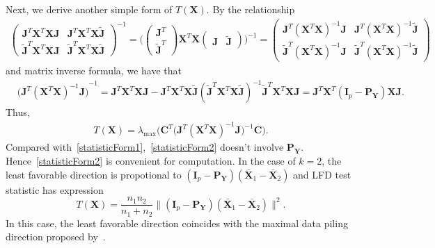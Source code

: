 \documentclass[12pt]{article} %
\newcommand{\bA}{\mathbf{A}}
\newcommand{\bX}{\mathbf{X}}
\newcommand{\bP}{\mathbf{P}}
\newcommand{\bY}{\mathbf{Y}}
\newcommand{\bJ}{\mathbf{J}}
\newcommand{\bC}{\mathbf{C}}
\newcommand{\bI}{\mathbf{I}}
\theoremstyle{definition}
\begin{document}
Next, we derive another simple form of $T(\bX)$.
By the relationship
\begin{equation*}
    \begin{aligned}
        \begin{pmatrix}
            \bJ^T \bX^T \bX\bJ & \bJ^T \bX^T \bX\tilde{\bJ}\\
            \tilde{\bJ}^T \bX^T \bX \bJ & \tilde{\bJ}^T \bX^T \bX \tilde{\bJ}
        \end{pmatrix}^{-1}
        =
        \Big(
        \begin{pmatrix}
            \bJ^T\\
            \tilde{\bJ}^T
        \end{pmatrix}
        \bX^T \bX
        \begin{pmatrix}
            \bJ &\tilde{\bJ}
        \end{pmatrix}
        \Big)^{-1}
        =
        \begin{pmatrix}
            \bJ^T {(\bX^T \bX)}^{-1}\bJ & \bJ^T {(\bX^T \bX)}^{-1}\tilde{\bJ}\\
            \tilde{\bJ}^T {(\bX^T \bX)}^{-1}\bJ & \tilde{\bJ}^T {(\bX^T \bX)}^{-1} \tilde{\bJ}
        \end{pmatrix}
    \end{aligned}
\end{equation*}
and matrix inverse formula, we have that
\begin{equation*}
    \begin{aligned}
        &{\big( \bJ^T {(\bX^T \bX)}^{-1}\bJ \big)}^{-1}
        =\bJ^T \bX^T \bX \bJ - \bJ^T \bX^T \bX\tilde{\bJ}{(\tilde{\bJ}^T \bX^T \bX \tilde{\bJ})}^{-1}
            \tilde{\bJ}^T \bX^T \bX\bJ 
        = \bJ^T \bX^T( \bI_p- \bP_{\bY}) \bX \bJ.
    \end{aligned}
\end{equation*}
Thus, 
\begin{equation}\label{statisticForm2}
    \begin{aligned}
        T(\bX)=
        \lambda_{\max}\Big(\bC^T\big( \bJ^T (\bX^T \bX)^{-1}\bJ \big)^{-1}\bC\Big).
    \end{aligned}
\end{equation}
Compared with~\eqref{statisticForm1},~\eqref{statisticForm2} doesn't involve $\bP_{\bY}$.
Hence~\eqref{statisticForm2} is convenient for computation.
In the case of $k=2$, the least favorable direction is propotional to
$
(\bI_p-\bP_{\bY}) (\bar{\bX}_1-\bar{\bX}_2)
$ and LFD test statistic has expression
$$
T(\bX)=\frac{n_1 n_2}{n_1+n_2}\| (\bI_p-\bP_{\bY}) (\bar{\bX}_1-\bar{\bX}_2)\|^2.
$$
In this case, 
the least favorable direction coincides with the maximal data piling direction proposed by~\cite{Ahn2010}.
\end{document}
